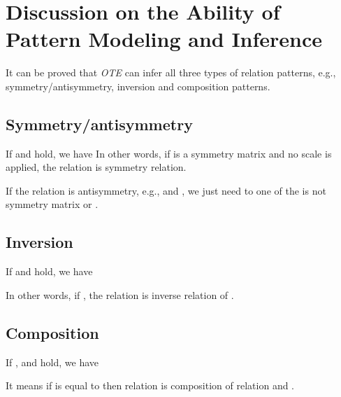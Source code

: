 \documentclass[11pt,a4paper]{article}
\begin{document}
\clearpage
\appendix

\section{Discussion on the Ability of Pattern Modeling and Inference}
\label{sec:appendix}
It can be proved that {\it OTE} can infer all three types of relation patterns, e.g., symmetry/antisymmetry, inversion and composition patterns.
\subsection{Symmetry/antisymmetry} 
If  and  hold, we have
{}
In other words, if  is a symmetry matrix and no scale is applied, the relation is symmetry relation.

If the relation is antisymmetry, e.g.,  and , we just need to one of the  is not symmetry matrix or .

\subsection{Inversion} 
If  and  hold, we have

In other words, if , the relation  is inverse relation of .

\subsection{Composition} 
If ,   and  hold, we  have

It means if  is equal to  then relation  is composition of relation  and .
\end{document}

